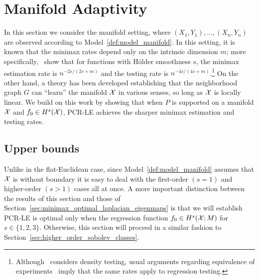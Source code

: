 
\section{Manifold Adaptivity}
\label{sec:manifold_adaptivity}

In this section we consider the manifold setting, where $(X_1,Y_1),\ldots,(X_n,Y_n)$ are observed according to Model~\ref{def:model_manifold}. In this setting, it is known that the minimax rates depend only on the intrinsic dimension $m$; more specifically,~\cite{bickel2007,ariascastro2018} show that for functions with H\"{o}lder smoothness $s$, the minimax estimation rate is $n^{-2s/(2s + m)}$ and the testing rate is $n^{-4s/(4s + m)}$.\footnote{Although~\cite{ariascastro2018} considers density testing, usual arguments regarding equivalence of experiments~\citep{brown96} imply that the same rates apply to regression testing.} On the other hand, a theory has been developed \citep{niyogi2008finding,belkin03,belkin05,niyogi2013,balakrishnan2012minimax,balakrishnan2013cluster} establishing that the neighborhood graph $G$ can ``learn'' the manifold $\mathcal{X}$ in various senses, so long as $\mathcal{X}$ is locally linear.  We build on this work by showing that when $P$ is supported on a manifold $\mathcal{X}$ and $f_0 \in H^s(\mathcal{X})$, PCR-LE achieves the sharper minimax estimation and testing rates.

\subsection{Upper bounds}
Unlike in the flat-Euclidean case, since Model~\ref{def:model_manifold} assumes that $\mathcal{X}$ is without boundary it is easy to deal with the first-order $(s = 1)$ and higher-order $(s > 1)$ cases all at once. A more important distinction between the results of this section and those of Section~\ref{sec:minimax_optimal_laplacian_eigenmaps} is that we will establish PCR-LE is optimal only when the regression function $f_0 \in H^s(\mathcal{X};M)$ for $s \in \{1,2,3\}$. Otherwise, this section will proceed in a similar fashion to Section~\ref{sec:higher_order_sobolev_classes}.

